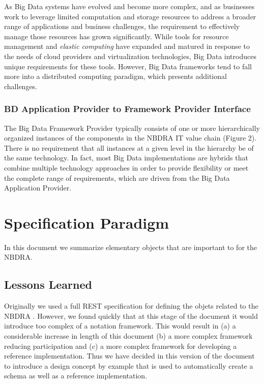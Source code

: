 \documentclass[10pt]{article}
\begin{document}
As Big Data systems have evolved and become more complex, and as
businesses work to leverage limited computation and storage resources
to address a broader range of applications and business challenges,
the requirement to effectively manage those resources has grown
significantly. While tools for resource management and {\it elastic
computing} have expanded and matured in response to the needs of cloud
providers and virtualization technologies, Big Data introduces unique
requirements for these tools. However, Big Data frameworks tend to
fall more into a distributed computing paradigm, which presents
additional challenges.

\subsubsection{BD Application Provider to Framework Provider
  Interface}\label{S:r-app-provider}

The Big Data Framework Provider typically consists of one or more
hierarchically organized instances of the components in the NBDRA IT
value chain (Figure 2). There is no requirement that all instances at
a given level in the hierarchy be of the same technology. In fact,
most Big Data implementations are hybrids that combine multiple
technology approaches in order to provide flexibility or meet the
complete range of requirements, which are driven from the Big Data
Application Provider.


	
\section{Specification Paradigm}

In this document we summarize elementary objects that are important to
for the NBDRA.

\subsection{Lessons Learned}

Originally we used a full REST specification for defining the objets
related to the NBDRA \cite{cloudmesh-nist}. However, we found quickly
that at this stage of the document it would introduce too complex of a
notation framework.  This would result in (a) a considerable increase
in length of this document (b) a more complex framework reducing
participation and (c) a more complex framework for developing a
reference implementation. Thus we have decided in this version of the
document to introduce a design concept by example that is used to
automatically create a schema as well as a reference implementation.
\end{document}
